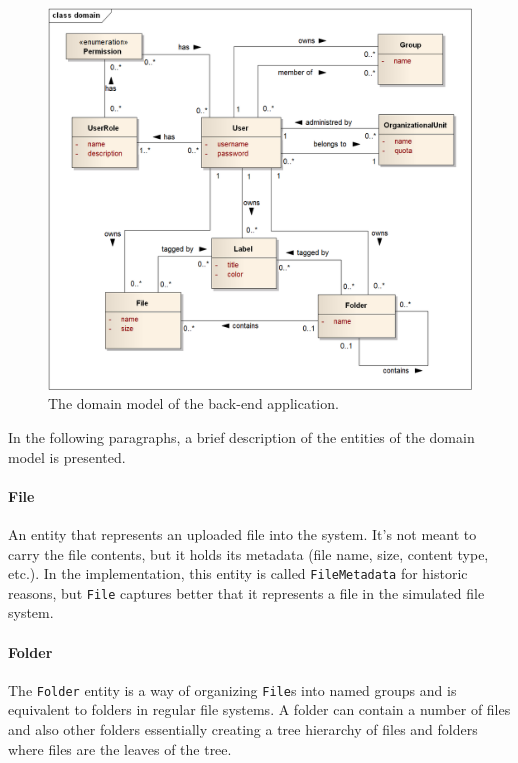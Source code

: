 \documentclass{book}
\begin{document}
\begin{figure}[h!]
\begin{center}
\includegraphics[width=0.98\columnwidth]{figures/domain/domain}
\caption{The domain model of the back-end application.%
}
\end{center}
\end{figure}

In the following paragraphs, a brief description of the entities of the
domain model is presented.

\paragraph{File}\label{file}

An entity that represents an uploaded file into the system. It's not
meant to carry the file contents, but it holds its metadata (file name,
size, content type, etc.). In the implementation, this entity is called
\texttt{FileMetadata} for historic reasons, but \texttt{File} captures
better that it represents a file in the simulated file system.

\paragraph{Folder}\label{folder}

The \texttt{Folder} entity is a way of organizing \texttt{File}s into
named groups and is equivalent to folders in regular file systems. A
folder can contain a number of files and also other folders essentially
creating a tree hierarchy of files and folders where files are the
leaves of the tree.
\end{document}
